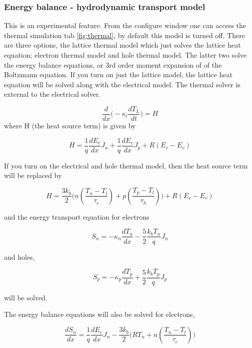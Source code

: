 \documentclass[11pt]{article}
\begin{document}
\subsubsection{Energy balance - hydrodynamic transport model}
This is an experimental feature.  From the configure window one can access the thermal simulation tab \ref{fig:thermal}, by default this model is turned off.  There are three options, the lattice thermal model which just solves the lattice heat equation; electron thermal model and hole thermal model.  The latter two solve the energy balance equations, or 3rd order moment expansion of of the Boltzmann equation.  If you turn on just the lattice model, the lattice heat equation will be solved along with the electrical model.  The thermal solver is external to the electrical solver. 

\begin{equation}
 \frac{d}{dx}\Bigg(-  \kappa_{l} \frac{dT_{L}}{dt}\Bigg)=H
\end{equation}
where H (the heat source term) is given by

\begin{equation}
H=\frac{1}{q}\frac{dE_{c}}{dx} J_{n}+\frac{1}{q}\frac{dE_{v}}{dx} J_{p}+R(E_{c}-E_{v})
\end{equation}

If you turn on the electrical and hole thermal model, then the heat source term will be replaced by

\begin{equation}
H=\frac{3 k_{b}}{2} \Bigg ( n (\frac{T_{n}-T_{l}}{\tau_{e}}) + p (\frac{T_{p}-T_{l}}{\tau_{h}})\Bigg) +R(E_{c}-E_{v})
\end{equation}

and the energy transport equation for electrons

\begin{equation}
S_n=-\kappa_n \frac{dT_{n}}{dx}-\frac{5}{2} \frac{k_{b}T_{n}}{q} J_{n}
\end{equation}

and holes,

\begin{equation}
S_p=-\kappa_p \frac{dT_{p}}{dx}+\frac{5}{2} \frac{k_{b}T_{p}}{q} J_{p}
\end{equation}

will be solved.

The energy balance equations will also be solved for electrons,

\begin{equation}
\frac{dS_{n}}{dx}=\frac{1}{q}\frac{dE_{c}}{dx} J_{n}-\frac{3 k_{b}}{2} \Bigg( R T_{n}+ n(\frac{T_{n}-T_{l}}{\tau_{e}}) \Bigg)
\end{equation}
\end{document}
